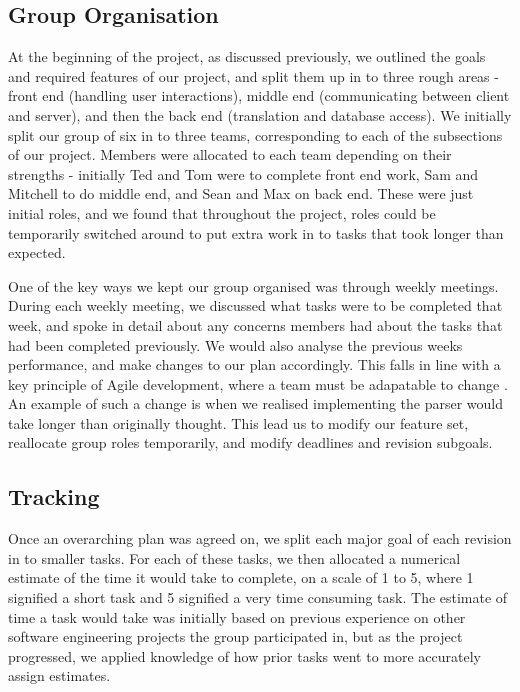 \documentclass[a4paper, 11pt]{article}
\begin{document}
  \subsection{Group Organisation}
    At the beginning of the project, as discussed previously, we outlined the
    goals and required features of our project, and split them up in to three
    rough areas - front end (handling user interactions),
    middle end (communicating between client and server), and
    then the back end (translation and database access).
    We initially split our group of six in to three teams,
    corresponding to each of the subsections of our project. Members were
    allocated to each team depending on their strengths - initially Ted and Tom
    were to complete front end work, Sam and Mitchell to do middle end, and
    Sean and Max on back end. These were just initial roles, and we found that
    throughout the project, roles could be temporarily switched around to put
    extra work in to tasks that took longer than expected.

    One of the key ways we kept our group organised was through weekly
    meetings.  During each weekly meeting, we discussed what tasks were to be
    completed that week, and spoke in detail about any concerns members had
    about the tasks that had been completed previously. We would also analyse
    the previous weeks performance, and make changes to our plan accordingly.
    This falls in line with a key principle of Agile development, where a team
    must be adapatable to change \cite{agilemanifesto}. 
    An example of such a change is when we realised implementing the parser 
    would take longer than originally thought. This lead us to modify our 
    feature set, reallocate group roles temporarily, and modify deadlines 
    and revision subgoals.

  \subsection{Tracking}
    Once an overarching plan was agreed on, we split each major goal of each
    revision in to smaller tasks. For each of these tasks, we then allocated a
    numerical estimate of the time it would take to complete, on a scale of 1
    to 5, where 1 signified a short task and 5 signified a very time consuming
    task. The estimate of time a task would take was initially based on
    previous experience on other software engineering projects the group
    participated in, but as the project progressed, we applied knowledge of how
    prior tasks went to more accurately assign estimates.
\end{document}
